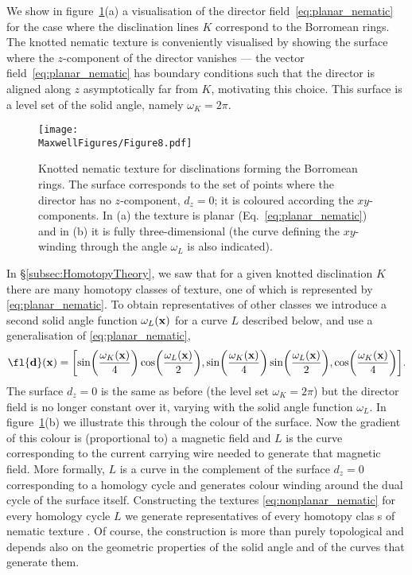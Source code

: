     We show in figure~\ref{fig:nematic}(a) a visualisation of the director field~\eqref{eq:planar_nematic} for the case where the disclination lines $K$ correspond to the Borromean rings. The knotted nematic texture is conveniently visualised by showing the surface where the $z$-component of the director vanishes --- the vector field~\eqref{eq:planar_nematic} has boundary conditions such that the director is aligned along $z$ asymptotically far from $K$, motivating this choice. This surface is a level set of the solid angle, namely $\omega_{K}=2\pi$. 
    \begin{figure}[htbp]
        \centering
        \texttt{[image: \\MaxwellFigures/Figure8.pdf]}
        \caption[Constructing knotted nematic disclinations from solid angle.]{Knotted nematic texture for disclinations forming the Borromean rings. The surface corresponds to the set of points where the director has no $z$-component, $d_z=0$; it is coloured according the $xy$-components. In (a) the texture is planar (Eq.~\eqref{eq:planar_nematic}) and in (b) it is fully three-dimensional (the curve defining the $xy$-winding through the angle $\omega_L$ is also indicated).}
        \label{fig:nematic}
    \end{figure}

   In \S\ref{subsec:HomotopyTheory}, we saw that for a given knotted disclination $K$ there are many homotopy classes of texture, one of which is represented by \eqref{eq:planar_nematic}. To obtain representatives of other classes we introduce a second solid angle function $\omega_{L}({\bf x})$ for a curve $L$ described below, and use a generalisation of \ref{eq:planar_nematic}, 
    \begin{equation}
        \fl    {\bf d}({\bf x}) = \biggl[ \sin\biggl(\frac{\omega_{K}({\bf x})}{4}\biggr) \cos\biggl(\frac{\omega_{L}({\bf x})}{2}\biggr) , \sin\biggl(\frac{\omega_{K}({\bf x})}{4}\biggr) \sin\biggl(\frac{\omega_{L}({\bf x})}{2}\biggr) , \cos\biggl(\frac{\omega_{K}({\bf x})}{4}\biggr)  \biggr].
        \label{eq:nonplanar_nematic}
    \end{equation}
     The surface $d_z=0$ is the same as before (the level set $\omega_{K}=2\pi$) but the director field is no longer constant over it, varying with the solid angle function $\omega_{L}$. In figure~\ref{fig:nematic}(b) we illustrate this through the colour of the surface. Now the gradient of this colour is (proportional to) a magnetic field and $L$ is the curve corresponding to the current carrying wire needed to generate that magnetic field. More formally, $L$ is a curve in the complement of the surface $d_z=0$ corresponding to a homology cycle and generates colour winding around the dual cycle of the surface itself. Constructing the textures \eqref{eq:nonplanar_nematic} for every homology cycle $L$ we generate representatives of every homotopy clas s of nematic texture \citep{Machon2016,AlexanderBook}. Of course, the construction is more than purely topological and depends also on the geometric properties of the solid angle and of the curves that generate them. 


